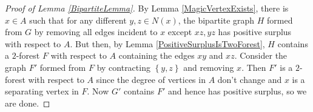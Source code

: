 \documentclass[12pt]{article}
\theoremstyle{plain}
\theoremstyle{definition}
\theoremstyle{remark}
\newcommand{\set}[1]{\left\{ #1 \right\}}
\begin{document}
\begin{proof}[Proof of Lemma \ref{BipartiteLemma}]
By Lemma \ref{MagicVertexExists}, there is $x \in A$ such that for any different $y,z \in N(x)$, the bipartite graph $H$ formed from $G$ by removing all edges incident to $x$ except $xz,yz$ has positive surplus with respect to $A$. But then, by Lemma \ref{PositiveSurplusIsTwoForest}, $H$ contains a $2$-forest $F$ with respect to $A$ containing the edges $xy$ and $xz$.
Consider the graph $F'$ formed from $F$ by contracting $\set{y,z}$ and removing $x$.  Then $F'$ is a $2$-forest with respect to $A$ since the degree of vertices in $A$ don't change and $x$ is a separating vertex in $F$.  Now $G'$ contains $F'$ and hence has positive surplus, so we are done.
\end{proof}



\end{document}
